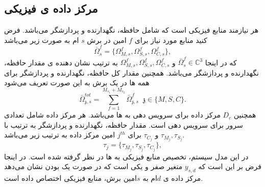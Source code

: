 \subsection{مرکز داده ی فیزیکی}
هر 
نیازمند منابع فیزیکی است که شامل حافظه، نگهدارنده و پردازشگر می‌باشد.
فرض کنید منابع مورد نیاز برای $f$ امین  در برش $s$ ام به صورت زیر می‌باشد
 \begin{equation}
\bar{\Omega}_{s}^f = \{\Omega_{M,{s}}^f, \Omega_{S,{s}}^f, \Omega_{C,{s}}^f \},
\end{equation}
که در اینجا 
 $\bar{\Omega}_{s}^f\in \mathbb{C}^{3}$
 و
$\Omega_{M,{s}}^f, \Omega_{S,{s}}^f, \Omega_{C,{s}}^f$
به ترتیب نشان دهنده ی مقدار حافظه، نگهدارنده و پردازشگر می‌باشد.
همچنین مقدار کل حافظه، نگهدارنده و پردازشگر برای همه  ها در یک برش به این صورت تعریف می‌شود
\begin{equation}
\textstyle \bar{\Omega}_{\mathfrak{z},s}^{tot} = \sum_{f=1}^{M_{s_1} + M_{s_2}}\bar{\Omega}_{\mathfrak{z},s}^f \;\; \mathfrak{z} \in \{M, S, C\}.
\end{equation}
همچنین $D_c$ مرکز داده برای سرویس دهی به  ها می‌باشد. هر مرکز داده شامل تعدادی سرور برای سرویس دهی است.
مقدار حافظه، نگهدارنده و پردازشگر به ترتیب با 
$\tau_{M_{j}}, \tau_{S_{j}}$
و
$\tau_{C_{j}} $
برای 
$j^{th}$
امین مرکز داده به ترتیب زیر می‌باشد.
\begin{equation*}
\tau_j = \{\tau_{M_{j}}, \tau_{S_{j}}, \tau_{C_{j}} \},
\end{equation*}
در این مدل سیستم، 
تخصیص منابع فیزیکی به  ها در نظر گرفته شده است. 
در اینجا فرض بر این است که $y_{s,d}$ متغیر صفر و یکی است که در صورت یک بودن نشان می‌دهد مرکز داده ی $d$ام به $s$امین برش، منابع فیزیکی اختصاص داده است.
